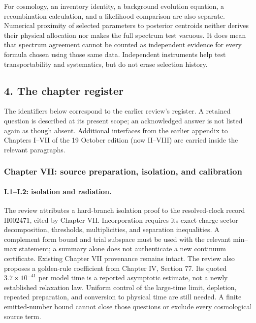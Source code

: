 For cosmology, an inventory identity, a background evolution equation, a recombination calculation, and a likelihood comparison are also separate. Numerical proximity of selected parameters to posterior centroids neither derives their physical allocation nor makes the full spectrum test vacuous. It does mean that spectrum agreement cannot be counted as independent evidence for every formula chosen using those same data. Independent instruments help test transportability and systematics, but do not erase selection history.

\subsection*{4. The chapter register}

The identifiers below correspond to the earlier review's register. A retained question is described at its present scope; an acknowledged answer is not listed again as though absent. Additional interfaces from the earlier appendix to Chapters I--VII of the 19 October edition (now II--VIII) are carried inside the relevant paragraphs.

\subsubsection*{Chapter VII: source preparation, isolation, and calibration}

\paragraph{I.1--I.2: isolation and radiation.}
The review attributes a hard-branch isolation proof to the resolved-clock record H002471, cited by Chapter VII. Incorporation requires its exact charge-sector decomposition, thresholds, multiplicities, and separation inequalities. A complement form bound and trial subspace must be used with the relevant min--max statement; a summary alone does not authenticate a new continuum certificate. Existing Chapter VII provenance remains intact. The review also proposes a golden-rule coefficient from Chapter IV, Section 77. Its quoted $3.7\times10^{-41}$ per model time is a reported asymptotic estimate, not a newly established relaxation law. Uniform control of the large-time limit, depletion, repeated preparation, and conversion to physical time are still needed. A finite emitted-number bound cannot close those questions or exclude every cosmological source term.

